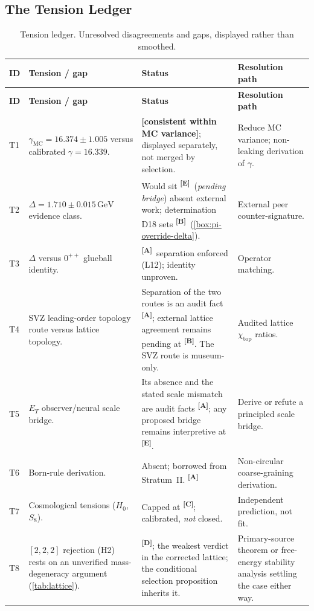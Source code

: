 \documentclass[12pt,a4paper,twoside]{article}
\theoremstyle{plain}
\theoremstyle{definition}
\theoremstyle{remark}
\newcommand{\GeV}{\,\mathrm{GeV}}
\newcommand{\catmark}[1]{\textsuperscript{\textsf{\textbf{[#1]}}}}
\newcommand{\DeltaGap}{1.710 \pm 0.015\GeV} %
\newcommand{\GammaGeom}{16.339} %
\newcommand{\GammaMC}{16.374 \pm 1.005} %
\begin{document}
\subsection{The Tension Ledger}
\label{sec:tension-ledger}

{\small
\renewcommand{\arraystretch}{1.3}
\begin{longtable}{p{} p{} p{} p{}}
\caption{Tension ledger. Unresolved disagreements and gaps, displayed
rather than smoothed.}
\label{tab:tensions}\\
\toprule
\textbf{ID} & \textbf{Tension / gap} & \textbf{Status} & \textbf{Resolution path} \\
\midrule
\endfirsthead
\toprule
\textbf{ID} & \textbf{Tension / gap} & \textbf{Status} & \textbf{Resolution path} \\
\midrule
\endhead
\bottomrule
\endfoot
T1 & $\gamma_{\mathrm{MC}} = \GammaMC$ versus calibrated $\gamma = \GammaGeom$. & \textbf{[consistent within MC variance]}; displayed separately, not merged by selection. & Reduce MC variance; non-leaking derivation of $\gamma$. \\
T2 & $\Delta = \DeltaGap$ evidence class. & Would sit \catmark{E}\ (\emph{pending bridge}) absent external work; determination D18 sets \catmark{B}\ (\cref{box:pi-override-delta}). & External peer counter-signature. \\
T3 & $\Delta$ versus $0^{++}$ glueball identity. & \catmark{A}\ separation enforced (L12); identity unproven. & Operator matching. \\
T4 & SVZ leading-order topology route versus lattice topology. & Separation of the two routes is an audit fact \catmark{A}; external lattice agreement remains pending at \catmark{B}. The SVZ route is museum-only. & Audited lattice $\chi_{\mathrm{top}}$ ratios. \\
T5 & $E_T$ observer/neural scale bridge. & Its absence and the stated scale mismatch are audit facts \catmark{A}; any proposed bridge remains interpretive at \catmark{E}. & Derive or refute a principled scale bridge. \\
T6 & Born-rule derivation. & Absent; borrowed from Stratum~II. \catmark{A} & Non-circular coarse-graining derivation. \\
T7 & Cosmological tensions ($H_0$, $S_8$). & Capped at \catmark{C}; calibrated, \emph{not} closed. & Independent prediction, not fit. \\
T8 & $[2,2,2]$ rejection (H2) rests on an unverified mass-degeneracy argument (\cref{tab:lattice}). & \catmark{D}; the weakest verdict in the corrected lattice; the conditional selection proposition inherits it. & Primary-source theorem or free-energy stability analysis settling the case either way. \\

\end{longtable}}
\end{document}
